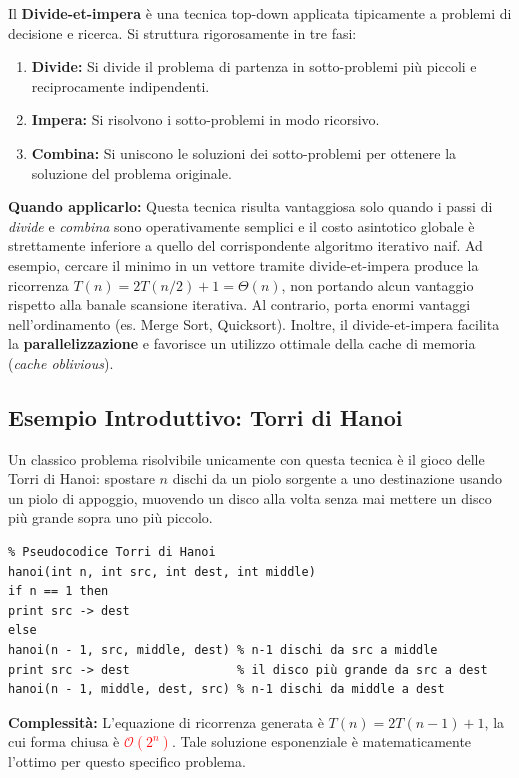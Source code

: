 \documentclass[12pt, a4paper]{article}
\begin{document}
Il \textbf{Divide-et-impera} è una tecnica top-down applicata tipicamente a problemi di decisione e ricerca. Si struttura rigorosamente in tre fasi:
\begin{enumerate}
\item \textbf{Divide:} Si divide il problema di partenza in sotto-problemi più piccoli e reciprocamente indipendenti.
\item \textbf{Impera:} Si risolvono i sotto-problemi in modo ricorsivo.
\item \textbf{Combina:} Si uniscono le soluzioni dei sotto-problemi per ottenere la soluzione del problema originale.
\end{enumerate}

\textbf{Quando applicarlo:}
Questa tecnica risulta vantaggiosa solo quando i passi di \textit{divide} e \textit{combina} sono operativamente semplici e il costo asintotico globale è strettamente inferiore a quello del corrispondente algoritmo iterativo naif.
Ad esempio, cercare il minimo in un vettore tramite divide-et-impera produce la ricorrenza $T(n) = 2T(n/2) + 1 = \Theta(n)$, non portando alcun vantaggio rispetto alla banale scansione iterativa. Al contrario, porta enormi vantaggi nell'ordinamento (es. Merge Sort, Quicksort).
Inoltre, il divide-et-impera facilita la \textbf{parallelizzazione} e favorisce un utilizzo ottimale della cache di memoria (\textit{cache oblivious}).

\subsection{Esempio Introduttivo: Torri di Hanoi}
Un classico problema risolvibile unicamente con questa tecnica è il gioco delle Torri di Hanoi: spostare $n$ dischi da un piolo sorgente a uno destinazione usando un piolo di appoggio, muovendo un disco alla volta senza mai mettere un disco più grande sopra uno più piccolo.

\begin{verbatim}
% Pseudocodice Torri di Hanoi
hanoi(int n, int src, int dest, int middle)
if n == 1 then
print src -> dest
else
hanoi(n - 1, src, middle, dest) % n-1 dischi da src a middle
print src -> dest               % il disco più grande da src a dest
hanoi(n - 1, middle, dest, src) % n-1 dischi da middle a dest
\end{verbatim}

\textbf{Complessità:} L'equazione di ricorrenza generata è $T(n) = 2T(n-1) + 1$, la cui forma chiusa è \textcolor{red}{$\mathcal{O}(2^n)$}. Tale soluzione esponenziale è matematicamente l'ottimo per questo specifico problema.
\end{document}
